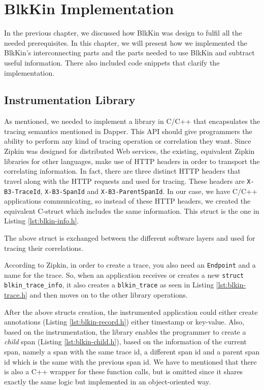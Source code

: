 \chapter{BlkKin Implementation}\label{ch:implementation}

In the previous chapter, we discussed how BlkKin was design to fulfil all the
needed prerequisites. In this chapter, we will present how we implemented the
BlkKin's interconnecting parts and the parts needed to use BlkKin and subtract
useful information. There also included code snippets that clarify the
implementation.

\section{Instrumentation Library}\label{sec:library}
As mentioned, we needed to implement a library in C/C++ that encapsulates the
tracing semantics mentioned in Dapper. This API should give programmers the
ability to perform any kind of tracing operation or correlation they want. Since
Zipkin was designed for distributed Web services, the existing, equivalent
Zipkin libraries for other languages, make use of HTTP headers in order to
transport the correlating information. In fact, there are three distinct HTTP
headers that travel along with the HTTP requests and used for tracing. These
headers are \texttt{X-B3-TraceId}, \texttt{X-B3-SpanId} and
\texttt{X-B3-ParentSpanId}. In our case, we have C/C++ applications
communicating, so instead of these HTTP headers, we created the equivalent
C-struct which includes the same information. This struct is the one in
Listing \ref{lst:blkin-info.h}.


The above struct is exchanged between the different software layers and used for
tracing their correlations.

According to Zipkin, in order to create a trace, you also need an
\texttt{Endpoint} and a name for the trace. So, when an application receives or
creates a new \texttt{struct blkin\_trace\_info}, it also creates a
\texttt{blkin\_trace} as seen in Listing \ref{lst:blkin-trace.h} and then moves
on to the other library operations. 

After the above structs creation, the instrumented application could either
create annotations (Listing \ref{lst:blkin-record.h}) either timestamp or
key-value. Also, based on the instrumentation, the library enables the
programmer to create a \textit{child} span (Listing \ref{lst:blkin-child.h}),
based on the information of the current span, namely a span with the same trace
id, a different span id and a parent span id which is the same with the previous
span id. We have to mentioned that there is also a C++ wrapper for these
function calls, but is omitted since it shares exactly the same logic but
implemented in an object-oriented way.

